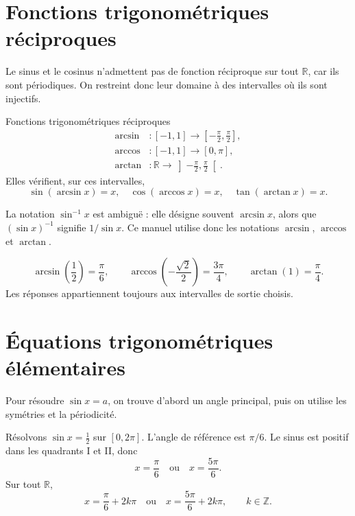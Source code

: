\documentclass[12pt,a4paper,openany]{book}
\newcommand{\R}{\mathbb{R}}
\newcommand{\Z}{\mathbb{Z}}
\begin{document}
\section{Fonctions trigonométriques réciproques}

Le sinus et le cosinus n'admettent pas de fonction réciproque sur tout $\R$, car ils sont périodiques. On restreint donc leur domaine à des intervalles où ils sont injectifs.

\begin{definition}{Fonctions trigonométriques réciproques}{}
\begin{align*}
\arcsin&:[-1,1]\to\left[-\frac\pi2,\frac\pi2\right],\\
\arccos&:[-1,1]\to[0,\pi],\\
\arctan&:\R\to\left]-\frac\pi2,\frac\pi2\right[.
\end{align*}
Elles vérifient, sur ces intervalles,
\[
\sin(\arcsin x)=x,
\quad
\cos(\arccos x)=x,
\quad
\tan(\arctan x)=x.
\]
\end{definition}

\begin{warningbox}
La notation $\sin^{-1}x$ est ambiguë : elle désigne souvent $\arcsin x$, alors que $(\sin x)^{-1}$ signifie $1/\sin x$. Ce manuel utilise donc les notations $\arcsin$, $\arccos$ et $\arctan$.
\end{warningbox}

\begin{examplebox}
\[
\arcsin\left(\frac12\right)=\frac\pi6,
\qquad
\arccos\left(-\frac{\sqrt2}{2}\right)=\frac{3\pi}{4},
\qquad
\arctan(1)=\frac\pi4.
\]
Les réponses appartiennent toujours aux intervalles de sortie choisis.
\end{examplebox}

\section{Équations trigonométriques élémentaires}

Pour résoudre $\sin x=a$, on trouve d'abord un angle principal, puis on utilise les symétries et la périodicité.

\begin{examplebox}
Résolvons $\sin x=\frac12$ sur $[0,2\pi]$. L'angle de référence est $\pi/6$. Le sinus est positif dans les quadrants I et II, donc
\[
x=\frac\pi6
\quad\text{ou}\quad
x=\frac{5\pi}{6}.
\]
Sur tout $\R$,
\[
x=\frac\pi6+2k\pi
\quad\text{ou}\quad
x=\frac{5\pi}{6}+2k\pi,
\qquad k\in\Z.
\]
\end{examplebox}
\end{document}

